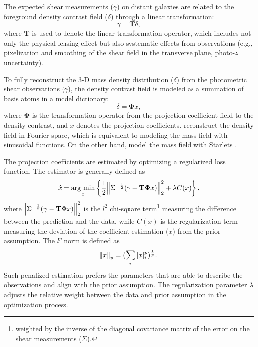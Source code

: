 The expected shear measurements ($\gamma$) on distant galaxies are related to
the foreground density contrast field ($\delta$) through a linear
transformation:
\begin{equation} \label{eq-intro-delta2shear}
    \gamma=\mathbf{T} \delta,
\end{equation}
where $\mathbf{T}$ is used to denote the linear transformation operator, which
includes not only the physical lensing effect but also systematic effects from
observations (e.g., pixelization and smoothing of the shear field in the
transverse plane, photo-$z$ uncertainty).

To fully reconstruct the $3$-D mass density distribution ($\delta$) from the
photometric shear observations ($\gamma$), the density contrast field is
modeled as a summation of basis atoms in a model dictionary:
\begin{equation} \label{eq-intro-dict}
\delta= \mathbf{\Phi} x,
\end{equation}
where $\mathbf{\Phi}$ is the transformation operator from the projection
coefficient field to the density contrast, and $x$ denotes the projection
coefficients. \citet{LSS-massMap-Wiener-Simon2009} reconstruct the density
field in Fourier space, which is equivalent to modeling the mass field with
sinusoidal functions.  On the other hand,
\citet{LSS-massMap-Glimpse3D-Leonard2014} model the mass field with Starlets
\citep{Starlet-Starck2015}.

The projection coefficients are estimated by optimizing a regularized loss
function. The estimator is generally defined as
\begin{equation}
\hat{x}=\argmin_{x} \left\{ \frac{1}{2}\norm{\Sigma^{-\frac{1}{2}}(\gamma-
\mathbf{T\Phi} x)}_2^2+ \lambda C(x) \right\},
\end{equation}
where $\norm{\Sigma^{-\frac{1}{2}}(\gamma - \mathbf{T\Phi} x)}_2^2$ is the
$l^2$ chi-square term\footnote{weighted by the inverse of the diagonal
covariance matrix of the error on the shear measurements ($\Sigma$).} measuring
the difference between the prediction and the data, while $C(x)$ is the
regularization term measuring the deviation of the coefficient estimation ($x$)
from the prior assumption. The $l^p$ norm is defined as
\begin{equation}
\norm{x}_p=(\sum_{i} |x|^p_i)^{\frac{1}{p}}.
\end{equation}
Such penalized estimation prefers the parameters that are able to describe the
observations and align with the prior assumption. The regularization
parameter $\lambda$ adjusts the relative weight between the data and
prior assumption in the optimization process.

